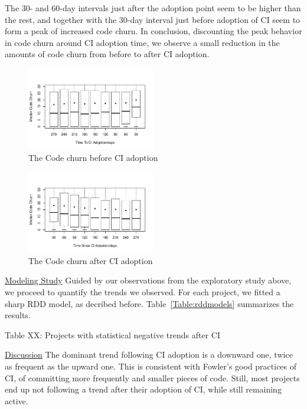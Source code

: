 \documentclass[conference]{IEEEtran}
\begin{document}
The 30- and 60-day intervals just after the adoption point seem to be higher than the rest, and together with the 30-day interval just before adoption of CI seem to form a peak of increased code churn.
In conclusion, discounting the peak behavior in code churn around CI adoption time, we observe a small reduction in the amounts of code churn from before to after CI adoption.


\begin{figure}[!t]
\centering
\includegraphics[width=0.5\textwidth]{churn_before.pdf}
\caption{The Code churn before CI adoption}
\label{Fig:CodeChurnBefore}
\end{figure}


\begin{figure}[!t]
\centering
\includegraphics[width=0.5\textwidth]{churn_after.pdf}
\caption{The Code churn after CI adoption}
\label{Fig:CodeChurnAfter}
\end{figure}

\noindent \underline{Modeling Study} 
Guided by our observations from the exploratory study above, we proceed to quantify the trends we observed.
For each project, we fitted a sharp RDD model, as decribed before.
Table~\ref{Table:rddmodels} summarizes the results.


Table XX: Projects with statistical negative trends after CI

\noindent \underline{Discussion}
The dominant trend following CI adoption is a downward one, twice as frequent as the upward one.
This is consistent with Fowler's good practices of CI, of committing more frequently and smaller pieces of code.
Still, most projects end up not following a trend after their adoption of CI, while still remaining active.
\end{document}
